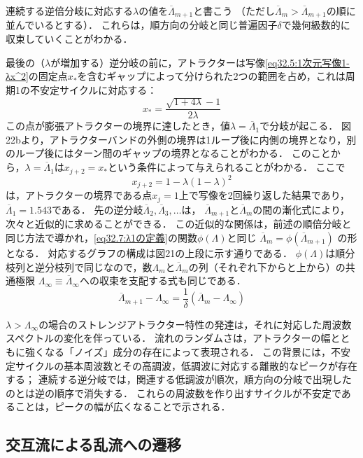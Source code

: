 連続する逆倍分岐に対応する$\lambda$の値を$\overline{\Lambda}_{m+1}$と書こう
（ただし$\overline{\Lambda}_m > \overline{\Lambda}_{m+1}$の順に並んでいるとする）．
これらは，順方向の分岐と同じ普遍因子$\delta$で幾何級数的に収束していくことがわかる．




最後の（$\lambda$が増加する）逆分岐の前に，アトラクターは写像\eqref{eq32.5:1次元写像1-λx^2}の固定点$x_*$を含むギャップによって分けられた2つの範囲を占め，これは周期1の不安定サイクルに対応する：
\[
    x_* = \frac{\sqrt{1+4\lambda}-1}{2\lambda}
\]
この点が膨張アトラクターの境界に達したとき，値$\lambda=\overline{\Lambda}_1$で分岐が起こる．
図22bより，アトラクターバンドの外側の境界は1ループ後に内側の境界となり，別のループ後にはターン間のギャップの境界となることがわかる．
このことから，$\lambda=\overline{\Lambda}_1$は$x_{j+2}=x_*$という条件によって与えられることがわかる．
ここで
\[
    x_{j+2} = 1-\lambda(1-\lambda)^2
\]
は，アトラクターの境界である点$x_j=1$上で写像を2回繰り返した結果であり，$\overline{\Lambda}_1=1.543$である．
先の逆分岐$\overline{\Lambda}_2, \overline{\Lambda}_3, \ldots$は，
$\overline{\Lambda}_{m+1}$と$\overline{\Lambda}_m$の間の漸化式により，次々と近似的に求めることができる．
この近似的な関係は，前述の順倍分岐と同じ方法で導かれ，\eqref{eq32.7:λ1の定義}の関数$\phi(\Lambda)$と同じ
$\overline{\Lambda}_m = \phi(\overline{\Lambda}_{m+1})$
の形となる．
対応するグラフの構成は図21の上段に示す通りである．
$\phi(\Lambda)$は順分枝列と逆分枝列で同じなので，数$\Lambda_m$と$\overline{\Lambda}_m$の列（それぞれ下からと上から）の共通極限
$\Lambda_\infty \equiv \overline{\Lambda}_\infty$への収束を支配する式も同じである．
\begin{equation}
    \overline{\Lambda}_{m+1} - \Lambda_\infty = \frac{1}{\delta} (\overline{\Lambda}_m-\Lambda_\infty)
\end{equation}




$\lambda>\Lambda_\infty$の場合のストレンジアトラクター特性の発達は，それに対応した周波数スペクトルの変化を伴っている．
流れのランダムさは，アトラクターの幅とともに強くなる「ノイズ」成分の存在によって表現される．
この背景には，不安定サイクルの基本周波数とその高調波，低調波に対応する離散的なピークが存在する；
連続する逆分岐では，関連する低調波が順次，順方向の分岐で出現したのとは逆の順序で消失する．
これらの周波数を作り出すサイクルが不安定であることは，ピークの幅が広くなることで示される．



\subsection*{交互流による乱流への遷移}

